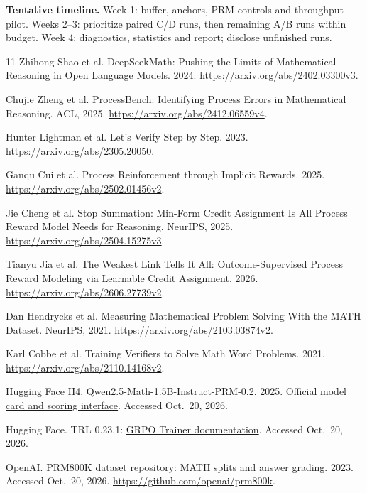 \documentclass{article}
\begin{document}
\textbf{Tentative timeline.} Week 1: buffer, anchors, PRM controls and throughput pilot. Weeks 2--3: prioritize paired C/D runs, then remaining A/B runs within budget. Week 4: diagnostics, statistics and report; disclose unfinished runs.
\clearpage
\begin{thebibliography}{11}
Zhihong Shao et al. DeepSeekMath: Pushing the Limits of Mathematical Reasoning in Open Language Models. 2024.
\url{https://arxiv.org/abs/2402.03300v3}.

Chujie Zheng et al. ProcessBench: Identifying Process Errors in Mathematical Reasoning. ACL, 2025.
\url{https://arxiv.org/abs/2412.06559v4}.

Hunter Lightman et al. Let's Verify Step by Step. 2023.
\url{https://arxiv.org/abs/2305.20050}.

Ganqu Cui et al. Process Reinforcement through Implicit Rewards. 2025.
\url{https://arxiv.org/abs/2502.01456v2}.

Jie Cheng et al. Stop Summation: Min-Form Credit Assignment Is All Process Reward Model Needs for Reasoning. NeurIPS, 2025.
\url{https://arxiv.org/abs/2504.15275v3}.

Tianyu Jia et al. The Weakest Link Tells It All: Outcome-Supervised Process Reward Modeling via Learnable Credit Assignment. 2026.
\url{https://arxiv.org/abs/2606.27739v2}.

Dan Hendrycks et al. Measuring Mathematical Problem Solving With the MATH Dataset. NeurIPS, 2021.
\url{https://arxiv.org/abs/2103.03874v2}.

Karl Cobbe et al. Training Verifiers to Solve Math Word Problems. 2021.
\url{https://arxiv.org/abs/2110.14168v2}.

Hugging Face H4. Qwen2.5-Math-1.5B-Instruct-PRM-0.2. 2025.
\href{https://huggingface.co/HuggingFaceH4/Qwen2.5-Math-1.5B-Instruct-PRM-0.2}{Official model card and scoring interface}. Accessed Oct.\ 20, 2026.

Hugging Face. TRL 0.23.1: \href{https://huggingface.co/docs/trl/v0.23.1/grpo_trainer}{GRPO Trainer documentation}. Accessed Oct.\ 20, 2026.

OpenAI. PRM800K dataset repository: MATH splits and answer grading. 2023. Accessed Oct.\ 20, 2026.
\url{https://github.com/openai/prm800k}.
\end{thebibliography}
\end{document}
